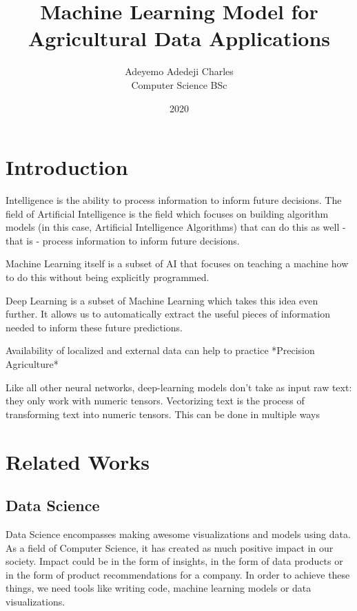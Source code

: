 \documentclass[
]{thesis-ekf}
\begin{document}
\title{Machine Learning Model for Agricultural Data Applications}
\author{Adeyemo Adedeji Charles\\Computer Science BSc}
\date{2020}
\maketitle

\tableofcontents

\chapter*{Introduction}


Intelligence is the ability to process information to inform future decisions. The field of Artificial Intelligence is the field which focuses on building algorithm models (in this case, Artificial Intelligence \cite{black2009books} Algorithms) that can do this as well - that is - process information to inform future decisions.

Machine Learning itself is a subset of AI that focuses on teaching a machine how to do this without being explicitly programmed. 

Deep Learning is a subset of Machine Learning which takes this idea even further. It allows us to automatically extract the useful pieces of information needed to inform these future predictions.

Availability of localized and external data can help to practice *Precision Agriculture*


 
 
 
 Like all other neural networks, deep-learning models don't take as input raw text:
 they only work with numeric tensors. Vectorizing text is the process of transforming text
 into numeric tensors. This can be done in multiple ways


\chapter{Related Works}
\section{Data Science}
Data Science encompasses making awesome visualizations and models using data. As a field of Computer Science, it has created as much positive impact in our society. Impact could be in the form of insights, in the form of data products or in the form of product recommendations for a company. In order to achieve these things, we need tools like writing code, machine learning models or data visualizations.
\end{document}
